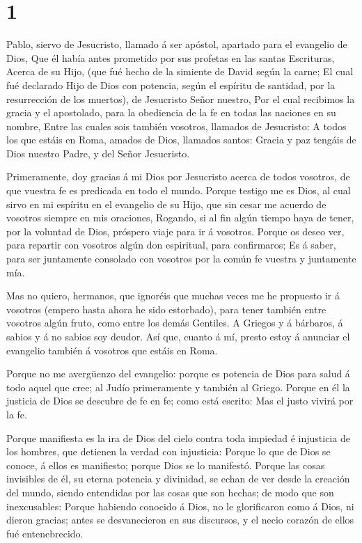 \hypertarget{section}{%
\section{1}\label{section}}

 Pablo, siervo de Jesucristo, llamado á ser apóstol,
apartado para el evangelio de Dios,  Que él había antes
prometido por sus profetas en las santas Escrituras,  Acerca
de su Hijo, (que fué hecho de la simiente de David según la carne;
 El cual fué declarado Hijo de Dios con potencia, según el
espíritu de santidad, por la resurrección de los muertos), de Jesucristo
Señor nuestro,  Por el cual recibimos la gracia y el
apostolado, para la obediencia de la fe en todas las naciones en su
nombre,  Entre las cuales sois también vosotros, llamados de
Jesucristo:  A todos los que estáis en Roma, amados de Dios,
llamados santos: Gracia y paz tengáis de Dios nuestro Padre, y del Señor
Jesucristo.

 Primeramente, doy gracias á mi Dios por Jesucristo acerca
de todos vosotros, de que vuestra fe es predicada en todo el mundo.
 Porque testigo me es Dios, al cual sirvo en mi espíritu en
el evangelio de su Hijo, que sin cesar me acuerdo de vosotros siempre en
mis oraciones,  Rogando, si al fin algún tiempo haya de
tener, por la voluntad de Dios, próspero viaje para ir á vosotros.
 Porque os deseo ver, para repartir con vosotros algún don
espiritual, para confirmaros;  Es á saber, para ser
juntamente consolado con vosotros por la común fe vuestra y juntamente
mía.

 Mas no quiero, hermanos, que ignoréis que muchas veces me
he propuesto ir á vosotros (empero hasta ahora he sido estorbado), para
tener también entre vosotros algún fruto, como entre los demás Gentiles.
 A Griegos y á bárbaros, á sabios y á no sabios soy deudor.
 Así que, cuanto á mí, presto estoy á anunciar el evangelio
también á vosotros que estáis en Roma.

 Porque no me avergüenzo del evangelio: porque es potencia
de Dios para salud á todo aquel que cree; al Judío primeramente y
también al Griego.  Porque en él la justicia de Dios se
descubre de fe en fe; como está escrito: Mas el justo vivirá por la fe.

 Porque manifiesta es la ira de Dios del cielo contra toda
impiedad é injusticia de los hombres, que detienen la verdad con
injusticia:  Porque lo que de Dios se conoce, á ellos es
manifiesto; porque Dios se lo manifestó.  Porque las cosas
invisibles de él, su eterna potencia y divinidad, se echan de ver desde
la creación del mundo, siendo entendidas por las cosas que son hechas;
de modo que son inexcusables:  Porque habiendo conocido á
Dios, no le glorificaron como á Dios, ni dieron gracias; antes se
desvanecieron en sus discursos, y el necio corazón de ellos fué
entenebrecido.

